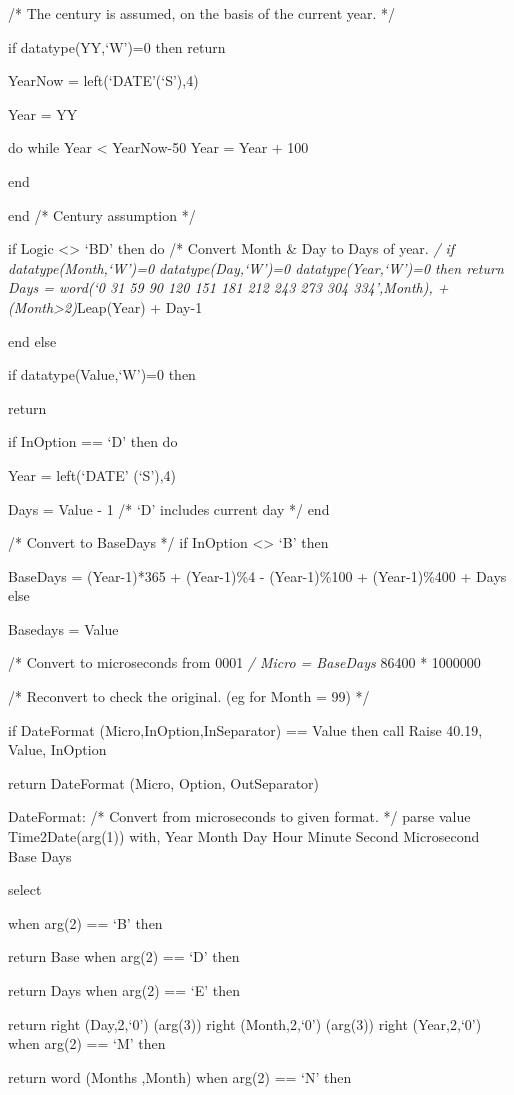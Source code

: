 /* The century is assumed, on the basis of the current year. */

if datatype(YY,`W')=0 then return

YearNow = left(`DATE'(`S'),4)

Year = YY

do while Year \textless{} YearNow-50 Year = Year + 100

end

end /* Century assumption */

if Logic \textless\textgreater{} `BD' then do /* Convert Month \& Day to
Days of year. \emph{/ if datatype(Month,`W')=0 \textbar{}
datatype(Day,`W')=0 \textbar{} datatype(Year,`W')=0 then return Days =
word(`0 31 59 90 120 151 181 212 243 273 304 334',Month), +
(Month\textgreater2)}Leap(Year) + Day-1

end else

if datatype(Value,`W')=0 then

return

if InOption == `D' then do

Year = left(`DATE' (`S'),4)

Days = Value - 1 /* `D' includes current day */ end

/* Convert to BaseDays */ if InOption \textless\textgreater{} `B' then

BaseDays = (Year-1)*365 + (Year-1)\%4 - (Year-1)\%100 + (Year-1)\%400 +
Days else

Basedays = Value

/* Convert to microseconds from 0001 \emph{/ Micro = BaseDays } 86400 *
1000000

/* Reconvert to check the original. (eg for Month = 99) */

if DateFormat (Micro,InOption,InSeparator) == Value then call Raise
40.19, Value, InOption

return DateFormat (Micro, Option, OutSeparator)

DateFormat: /* Convert from microseconds to given format. */ parse value
Time2Date(arg(1)) with, Year Month Day Hour Minute Second Microsecond
Base Days

select

when arg(2) == `B' then

return Base when arg(2) == `D' then

return Days when arg(2) == `E' then

return right (Day,2,`0') (arg(3)) right (Month,2,`0') (arg(3)) right
(Year,2,`0') when arg(2) == `M' then

return word (Months ,Month) when arg(2) == `N' then

